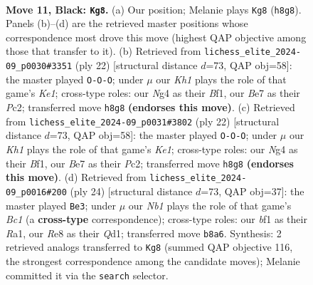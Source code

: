 \documentclass[11pt]{article}
\begin{document}
\begin{figure}[p]
\label{fig:thought-m19}
\end{figure}

\clearpage

\begin{figure}[p]\centering
\begin{subfigure}{0.46\textwidth}\centering
\resizebox{\linewidth}{!}{%
\newchessgame
\chessboard[
  setfen={rnbqr2k/pp2bppp/2p5/3p4/P2P1Bn1/1PN1P3/2Q1NPPP/R3KB1R b KQ - 0 11},
  showmover=false,
  pgfstyle=straightmove, color=movearrow, markmove={h8-g8}
]}
\caption{}
\end{subfigure}\hfill
\begin{subfigure}{0.46\textwidth}\centering
\resizebox{\linewidth}{!}{%
\newchessgame
\chessboard[
  setfen={r1b1kb1r/2qn1pp1/p2ppn1p/1p6/3NPP2/P1N2Q2/1PP2BPP/R3KB1R w KQkq - 0 12},
  showmover=false,
  pgfstyle=straightmove, color=movearrow, markmove={e1-c1}
]}
\caption{}
\end{subfigure}
\\[4pt]
\begin{subfigure}{0.46\textwidth}\centering
\resizebox{\linewidth}{!}{%
\newchessgame
\chessboard[
  setfen={r1b1kb1r/2qn1pp1/p2ppn1p/1p6/3NPP2/P1N2Q2/1PP2BPP/R3KB1R w KQkq - 0 12},
  showmover=false,
  pgfstyle=straightmove, color=movearrow, markmove={e1-c1}
]}
\caption{}
\end{subfigure}\hfill
\begin{subfigure}{0.46\textwidth}\centering
\resizebox{\linewidth}{!}{%
\newchessgame
\chessboard[
  setfen={r3k2r/1pq1nppp/p1n1p3/3pPb2/3N1P2/2P5/PP2B1PP/R1BQK2R w KQkq - 1 13},
  showmover=false,
  pgfstyle=straightmove, color=movearrow, markmove={c1-e3}
]}
\caption{}
\end{subfigure}
\caption{\textbf{Move 11, Black: \texttt{Kg8}.} (a) Our position; Melanie plays \texttt{Kg8} (\texttt{h8g8}). Panels (b)--(d) are the retrieved master positions whose correspondence most drove this move (highest QAP objective among those that transfer to it). (b) Retrieved from \texttt{lichess\_elite\_2024-09\_p0030\#3351} (ply 22) [structural distance $d$=73, QAP obj=58]: the master played \texttt{O-O-O}; under $\mu$ our \emph{Kh1} plays the role of that game's \emph{Ke1}; cross-type roles: our \emph{N}g4 as their \emph{B}f1, our \emph{B}e7 as their \emph{P}c2; transferred move \texttt{h8g8} \textbf{(endorses this move)}. (c) Retrieved from \texttt{lichess\_elite\_2024-09\_p0031\#3802} (ply 22) [structural distance $d$=73, QAP obj=58]: the master played \texttt{O-O-O}; under $\mu$ our \emph{Kh1} plays the role of that game's \emph{Ke1}; cross-type roles: our \emph{N}g4 as their \emph{B}f1, our \emph{B}e7 as their \emph{P}c2; transferred move \texttt{h8g8} \textbf{(endorses this move)}. (d) Retrieved from \texttt{lichess\_elite\_2024-09\_p0016\#200} (ply 24) [structural distance $d$=73, QAP obj=37]: the master played \texttt{Be3}; under $\mu$ our \emph{Nb1} plays the role of that game's \emph{Bc1} (a \textbf{cross-type} correspondence); cross-type roles: our \emph{b}f1 as their \emph{R}a1, our \emph{R}e8 as their \emph{Q}d1; transferred move \texttt{b8a6}. Synthesis: 2 retrieved analogs transferred to \texttt{Kg8} (summed QAP objective 116, the strongest correspondence among the candidate moves); Melanie committed it via the \texttt{search} selector.}

\end{figure}
\end{document}
